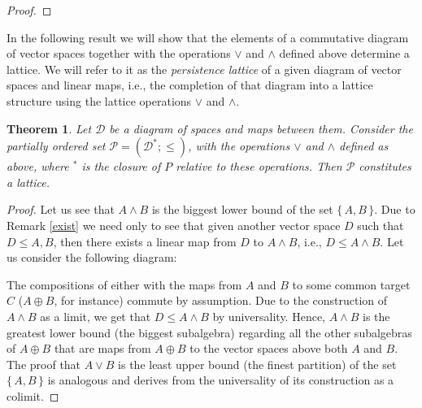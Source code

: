 \documentclass[10pt]{amsart}
\newtheorem{theorem}{Theorem}[section]
\def \DD{{\mathcal D}}
\def \Pe{{\mathcal P}}
\newcommand{\set}[1]{\{\,#1\,\}}
\begin{document}
\begin{proof}
\end{proof}





In the following result we will show that the elements of a commutative diagram of
vector spaces together with the operations $\vee $ and $\wedge $ defined above determine a lattice.  
We will refer to it as the \emph{persistence lattice} of a given diagram of vector spaces and linear maps, 
i.e., the completion of that diagram into a lattice structure using the lattice operations $\vee $ and $\wedge $.

\begin{theorem}
Let $\DD$ be a diagram of spaces and maps between them. 
Consider the partially ordered set $\Pe=(\DD^*;\leq)$, with the operations $\vee $ and $\wedge $ defined as above, 
where $^*$ is the closure of $P$ relative to these operations.
Then $\Pe$ constitutes a lattice.
\end{theorem}

\begin{proof}
Let us see that $A\wedge B$ is the biggest lower bound of the set $\set{A,B}$.
Due to Remark \ref{exist} we need only to see that given another vector space $D$ such that $D\leq A,B$, then there exists a linear map from $D$ to $A\wedge B$, i.e., $D \leq A\wedge B$. 
Let us consider the following diagram:

\begin{center}
\end{center}  

The compositions of either with the maps from $A$ and $B$ to some common target $C$ ($A\oplus B$, for instance) commute by assumption.
Due to the construction of $A\wedge B$ as a limit, we get that $D\leq A\wedge B$ by universality.
Hence, $A\wedge B$ is the greatest lower bound (the biggest subalgebra) regarding all the other subalgebras of $A\oplus B$ that are maps from $A\oplus B$ to the vector spaces above both $A$ and $B$.
%
The proof that $A\vee B$ is the least upper bound (the finest partition) of the set $\set{A,B}$ is analogous and derives from the universality of its construction as a colimit.
\end{proof}
\end{document}
